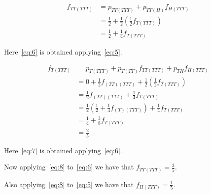 \documentclass[12pt, a4paper]{article}
\begin{document}
\begin{subequations}
  \begin{align}
    f_{TT(TTT)} &= p_{TT(TTT)} + p_{TT(H)} f_{H(TTT)}\\
                &= \frac{1}{2} + \frac{1}{2} (\frac{1}{2}f_{T(TTT)}) \\
                &= \frac{1}{2} + \frac{1}{4} f_{T(TTT)}\label{eq:6}
  \end{align}
\end{subequations}

Here~\ref{eq:6} is obtained applying~\ref{eq:5}.


\begin{subequations}
  \begin{align}
    f_{T(TTT)} &= p_{T(TTT)} + p_{T(TT)} f_{TT(TTT)} + p_{TH}f_{H(TTT)}\\
               &= 0 + \frac{1}{2} f_{(TT)(TTT)} + \frac{1}{2} (\frac{1}{2}f_{T(TTT)}) \\
               &= \frac{1}{2} f_{(TT)(TTT)} + \frac{1}{4}f_{T(TTT)}\\
               &= \frac{1}{2} (\frac{1}{2} + \frac{1}{4}f_{(T)(TTT)}) + \frac{1}{4}f_{T(TTT)}\label{eq:7}\\
               &= \frac{1}{4} + \frac{3}{8} f_{T(TTT)}\\
               &= \frac{2}{5}\label{eq:8}
  \end{align}
\end{subequations}

Here~\ref{eq:7} is obtained applying~\ref{eq:6}.

Now applying~\ref{eq:8} to~\ref{eq:6} we have that $f_{TT(TTT)} = \frac{3}{5}$.

Also applying~\ref{eq:8} to~\ref{eq:5} we have that $f_{H(TTT)} = \frac{1}{5}$.
\end{document}
